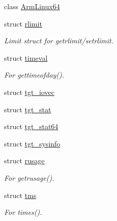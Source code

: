 \begin{DoxyCompactItemize}
class \hyperlink{classArmLinux64}{ArmLinux64}
\item 
struct \hyperlink{structArmLinux64_1_1rlimit}{rlimit}
\begin{DoxyCompactList}\small\item\em Limit struct for getrlimit/setrlimit. \item\end{DoxyCompactList}\item 
struct \hyperlink{structArmLinux64_1_1timeval}{timeval}
\begin{DoxyCompactList}\small\item\em For gettimeofday(). \item\end{DoxyCompactList}\item 
struct \hyperlink{structArmLinux64_1_1tgt__iovec}{tgt\_\-iovec}
\item 
struct \hyperlink{structArmLinux64_1_1tgt__stat}{tgt\_\-stat}
\item 
struct \hyperlink{structArmLinux64_1_1tgt__stat64}{tgt\_\-stat64}
\item 
struct \hyperlink{structArmLinux64_1_1tgt__sysinfo}{tgt\_\-sysinfo}
\item 
struct \hyperlink{structArmLinux64_1_1rusage}{rusage}
\begin{DoxyCompactList}\small\item\em For getrusage(). \item\end{DoxyCompactList}\item 
struct \hyperlink{structArmLinux64_1_1tms}{tms}
\begin{DoxyCompactList}\small\item\em For times(). \item\end{DoxyCompactList}\end{DoxyCompactItemize}
